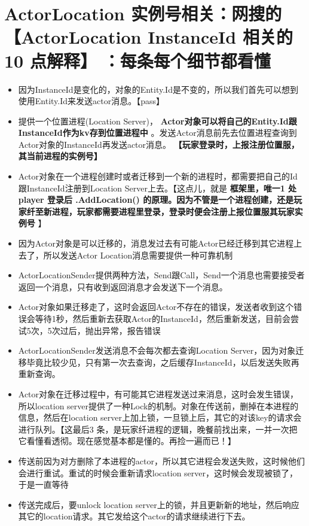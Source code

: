\documentclass[9pt, b5paper]{article}
\begin{document}
\section{ActorLocation 实例号相关：网搜的 \textbf{【ActorLocation InstanceId 相关的10 点解释】} ：每条每个细节都看懂}
\label{sec-6}
\begin{itemize}
\item 因为InstanceId是变化的，对象的Entity.Id是不变的，所以我们首先可以想到使用Entity.Id来发送actor消息。【pass】
\item 提供一个位置进程(Location Server)， \textbf{Actor对象可以将自己的Entity.Id跟InstanceId作为kv存到位置进程中} 。发送Actor消息前先去位置进程查询到Actor对象的InstanceId再发送actor消息。 \textbf{【玩家登录时，上报注册位置服，其当前进程的实例号】}
\item Actor对象在一个进程创建时或者迁移到一个新的进程时，都需要把自己的Id跟InstanceId注册到Location Server上去。【这点儿，就是 \textbf{框架里，唯一1 处 player 登录后 .AddLocation() 的原理。因为不管是一个进程创建，还是玩家纤至新进程，玩家都需要进程里登录，登录时便会注册上报位置服其玩家实例号} 】
\item 因为Actor对象是可以迁移的，消息发过去有可能Actor已经迁移到其它进程上去了，所以发送Actor Location消息需要提供一种可靠机制
\item ActorLocationSender提供两种方法，Send跟Call，Send一个消息也需要接受者返回一个消息，只有收到返回消息才会发送下一个消息。
\item Actor对象如果迁移走了，这时会返回Actor不存在的错误，发送者收到这个错误会等待1秒，然后重新去获取Actor的InstanceId，然后重新发送，目前会尝试5次，5次过后，抛出异常，报告错误
\item ActorLocationSender发送消息不会每次都去查询Location Server，因为对象迁移毕竟比较少见，只有第一次去查询，之后缓存InstanceId，以后发送失败再重新查询。
\item Actor对象在迁移过程中，有可能其它进程发送过来消息，这时会发生错误，所以location server提供了一种Lock的机制。对象在传送前，删掉在本进程的信息，然后在location server上加上锁，一旦锁上后，其它的对该key的请求会进行队列。【这最后3 条，是玩家纤进程的逻辑，晚餐前找出来，一并一次把它看懂看透彻。现在感觉基本都是懂的。再捡一遍而已！】
\item 传送前因为对方删除了本进程的actor，所以其它进程会发送失败，这时候他们会进行重试。重试的时候会重新请求location server，这时候会发现被锁了，于是一直等待
\item 传送完成后，要unlock location server上的锁，并且更新新的地址，然后响应其它的location请求。其它发给这个actor的请求继续进行下去。
\end{itemize}
\end{document}

